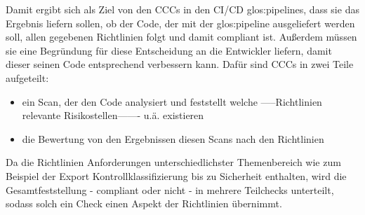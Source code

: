 \documentclass[../main.tex]{subfiles}
\begin{document}
Damit ergibt sich als Ziel von den \glspl{CCC} in den \gls{CI/CD} \glspl{glos:pipeline}, dass sie das Ergebnis liefern sollen, ob der Code, der mit der \gls{glos:pipeline} ausgeliefert werden soll, allen gegebenen Richtlinien folgt und damit compliant ist.
Außerdem müssen sie eine Begründung für diese Entscheidung an die Entwickler liefern, damit dieser seinen Code entsprechend verbessern kann.
\newpage
Dafür sind \glspl{CCC} in zwei Teile aufgeteilt:
\begin{itemize}
    \item ein Scan, der den Code analysiert und feststellt welche -----Richtlinien relevante Risikostellen------- u.\"a. existieren 
    \item die Bewertung von den Ergebnissen diesen Scans nach den Richtlinien
  \end{itemize}

Da die Richtlinien Anforderungen unterschiedlichster Themenbereich wie zum Beispiel der Export Kontrollklassifizierung bis zu Sicherheit enthalten, wird die Gesamtfeststellung - compliant oder nicht - in mehrere Teilchecks unterteilt, sodass solch ein Check einen Aspekt der Richtlinien übernimmt. 
\end{document}
